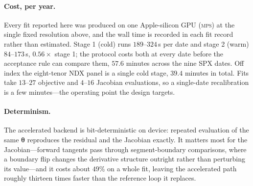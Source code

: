 \documentclass[11pt]{article}
\providecommand{\1}{\mathbf 1}
\newcommand{\bth}{{\boldsymbol{\theta}}}
\begin{document}
\paragraph{Cost, per year.} Every fit reported here was produced on one Apple-silicon GPU
(\textsc{mps}) at the single fixed resolution above, and the wall time is recorded in each fit
record rather than estimated. Stage 1 (cold) runs $189$--$324$\,s per date and stage 2 (warm)
$84$--$173$\,s, $0.56\times$ stage 1; the protocol costs both at every date before the acceptance
rule can compare them, $57.6$ minutes across the nine SPX dates. Off index the eight-tenor NDX panel
is a single cold stage, $39.4$ minutes in total. Fits take $13$--$27$ objective and $4$--$16$
Jacobian evaluations, so a single-date recalibration is a few minutes---the operating point the
design targets.

\paragraph{Determinism.} The accelerated backend is bit-deterministic on device: repeated evaluation
of the same $\bth$ reproduces the residual and the Jacobian exactly. It matters most for the
Jacobian---forward tangents pass through segment-boundary comparisons, where a boundary flip changes
the derivative structure outright rather than perturbing its value---and it costs about $49\%$ on a
whole fit, leaving the accelerated path roughly thirteen times faster than the reference loop it
replaces.
\end{document}
